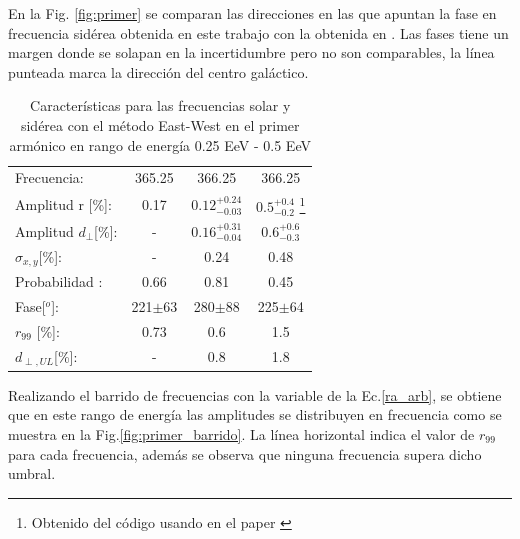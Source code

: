En la Fig. \ref{fig:primer} se comparan las direcciones en las que apuntan la fase en frecuencia sidérea obtenida en este trabajo con la obtenida en \cite{Aab_2020}. 
Las fases tiene un margen donde se solapan en la incertidumbre pero no son comparables, la línea punteada marca la dirección del centro galáctico.
\begin{table}[H]
    \begin{small}
        \begin{center}
            \begin{tabular}[c]{l|c||c|c}
                Frecuencia:                 & 365.25	  & 366.25	   & 366.25 \cite{Aab_2020}   \\
                Amplitud r [\%]:            & 0.17	      & $0.12^{+0.24}_{-0.03}$ 	   & $0.5^{+0.4}_{-0.2}$ \footnote[2]{\label{note1}Obtenido del código usando en el paper \cite{Aab_2020}}      \\
                Amplitud $d_\perp$[\%]:     & -	          & $0.16^{+0.31}_{-0.04}$ 	   & $0.6^{+0.6}_{-0.3}$       \\
                $\sigma_{x,y}$[\%]:         & -	          & 0.24	   & 0.48       \\
                Probabilidad      :         & 0.66        & 0.81	   & 0.45       \\
                Fase[$^o$]:                 & 221$\pm$63  & 280$\pm$88 & 225$\pm$64\footnotemark[3]\\
                $r_{99}$ [\%]:              & 0.73	      & 0.6       & 1.5\footnotemark[2]                \\
                $d_{\perp,UL}$[\%]:         & -           & 0.8       & 1.8      \\
            \end{tabular}
        \end{center}
    \end{small}
    \caption{Características para las frecuencias solar y sidérea con el método East-West en el primer armónico en rango de energía 0.25 EeV - 0.5 EeV}
    \label{tab:solar}
\end{table}


Realizando el barrido de frecuencias con la variable de la Ec.\ref{ra_arb}, se obtiene que en este rango de energía las amplitudes se  distribuyen en frecuencia como se muestra en la Fig.\ref{fig:primer_barrido}. La línea horizontal indica el valor de $r_{99}$ para cada frecuencia, además se observa que ninguna frecuencia supera dicho umbral.

